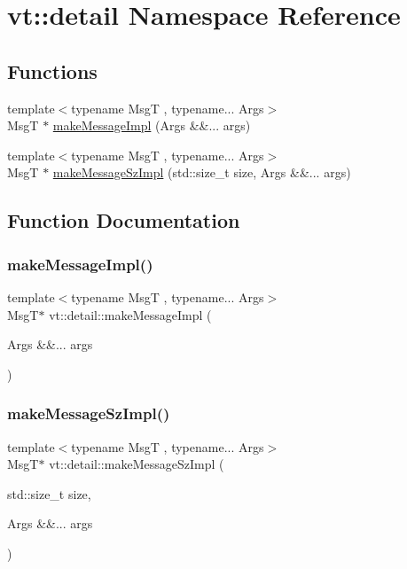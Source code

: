 \hypertarget{namespacevt_1_1detail}{}\section{vt\+:\+:detail Namespace Reference}
\label{namespacevt_1_1detail}
\subsection*{Functions}
\begin{DoxyCompactItemize}
\item 
{\footnotesize template$<$typename MsgT , typename... Args$>$ }\\MsgT $\ast$ \hyperlink{namespacevt_1_1detail_a5713d74f228ce37ce4b41646d7309c89}{make\+Message\+Impl} (Args \&\&... args)
\item 
{\footnotesize template$<$typename MsgT , typename... Args$>$ }\\MsgT $\ast$ \hyperlink{namespacevt_1_1detail_adbb2053e6c7d3f6ef6abcf79ac61a585}{make\+Message\+Sz\+Impl} (std\+::size\+\_\+t size, Args \&\&... args)
\end{DoxyCompactItemize}


\subsection{Function Documentation}
\mbox{\label{namespacevt_1_1detail_a5713d74f228ce37ce4b41646d7309c89}} 
\subsubsection{\texorpdfstring{make\+Message\+Impl()}{makeMessageImpl()}}
{\footnotesize\ttfamily template$<$typename MsgT , typename... Args$>$ \\
MsgT$\ast$ vt\+::detail\+::make\+Message\+Impl (\begin{DoxyParamCaption}\item[{Args \&\&...}]{args }\end{DoxyParamCaption})}

\mbox{\label{namespacevt_1_1detail_adbb2053e6c7d3f6ef6abcf79ac61a585}} 
\subsubsection{\texorpdfstring{make\+Message\+Sz\+Impl()}{makeMessageSzImpl()}}
{\footnotesize\ttfamily template$<$typename MsgT , typename... Args$>$ \\
MsgT$\ast$ vt\+::detail\+::make\+Message\+Sz\+Impl (\begin{DoxyParamCaption}\item[{std\+::size\+\_\+t}]{size,  }\item[{Args \&\&...}]{args }\end{DoxyParamCaption})}

